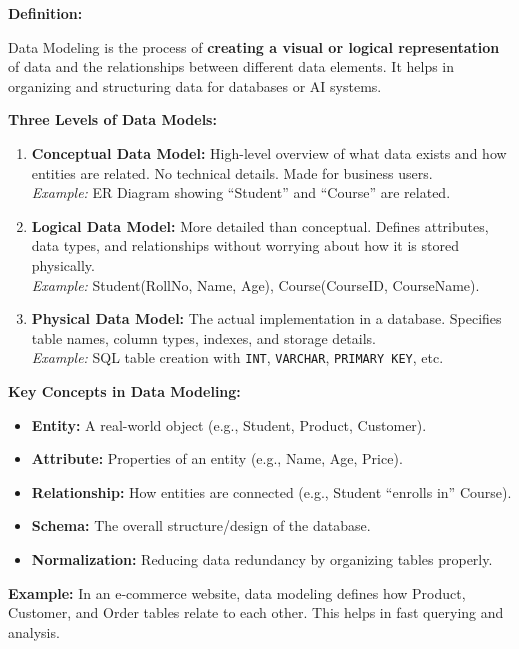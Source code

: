 \documentclass[12pt,a4paper]{article}
\newcommand{\term}[1]{\textbf{\color{headingcolor}#1}}
\begin{document}
\begin{answerenv}

\textbf{\color{headingcolor}Definition:}

Data Modeling is the process of \textbf{creating a visual or logical representation} of data and the relationships between different data elements. It helps in organizing and structuring data for databases or AI systems.

\vspace{6pt}
\textbf{\color{headingcolor}Three Levels of Data Models:}

\begin{enumerate}[leftmargin=1.8em, itemsep=5pt]
  \item \term{Conceptual Data Model:} High-level overview of what data exists and how entities are related. No technical details. Made for business users.\\
  \textit{Example:} ER Diagram showing ``Student'' and ``Course'' are related.

  \item \term{Logical Data Model:} More detailed than conceptual. Defines attributes, data types, and relationships without worrying about how it is stored physically.\\
  \textit{Example:} Student(RollNo, Name, Age), Course(CourseID, CourseName).

  \item \term{Physical Data Model:} The actual implementation in a database. Specifies table names, column types, indexes, and storage details.\\
  \textit{Example:} SQL table creation with \texttt{INT}, \texttt{VARCHAR}, \texttt{PRIMARY KEY}, etc.
\end{enumerate}

\vspace{6pt}
\textbf{\color{headingcolor}Key Concepts in Data Modeling:}
\begin{itemize}[leftmargin=1.5em, itemsep=3pt]
  \item \term{Entity:} A real-world object (e.g., Student, Product, Customer).
  \item \term{Attribute:} Properties of an entity (e.g., Name, Age, Price).
  \item \term{Relationship:} How entities are connected (e.g., Student ``enrolls in'' Course).
  \item \term{Schema:} The overall structure/design of the database.
  \item \term{Normalization:} Reducing data redundancy by organizing tables properly.
\end{itemize}

\begin{keypoint}
\textbf{Example:} In an e-commerce website, data modeling defines how Product, Customer, and Order tables relate to each other. This helps in fast querying and analysis.
\end{keypoint}

\end{answerenv}
\end{document}
